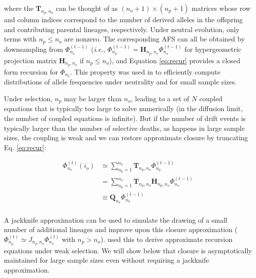 \documentclass[review]{elsarticle}
\newcommand{\afs}[2]{\Phi_{#1}^{(#2)}}
\begin{document}
where the $\mathbf{T}_{n_p,n_o}$ can be thought of as  $(n_o+1) \times (n_p+1)$ matrices whose row and column indices
correspond to the number of derived alleles in the offspring and contributing parental lineages,
respectively.
Under neutral evolution,  only terms with $n_p\leq n_o$ are nonzero. The corresponding AFS can 
all be obtained by downsampling from $\afs{n_o}{t-1}$ (\textit{i.e.}, $\afs{n_p}{t-1} = \mathbf{H}_{n_p,n_o} \afs{n_o}{t-1}$
for hypergeometric projection matrix $\mathbf{H}_{n_p,n_o}$ if $n_p\leq n_o$), and Equation
\eqref{eq:recur} provides a closed form recursion for $\Phi_{n_o}.$ This property was used in
\cite{JouganousEtAl2017} to efficiently compute distributions of allele frequencies under 
neutrality and for small sample sizes.

Under selection, $n_{p}$ may be larger than $n_o$, leading to a set of $N$ coupled
equations that is typically too large to solve numerically (in the diffusion limit, the number of coupled equations is infinite). 
But if the number of drift events is typically larger than the number of selective deaths, as happens in large sample sizes, 
the coupling is weak and we can restore approximate closure by truncating Eq. \eqref{eq:recur}:

\begin{equation}
\begin{split}
  \afs{n_o}{t}(i_o)
  &\simeq \sum_{n_p=1}^{n_{o}} \mathbf{T}_{n_p,n_o}                      \afs{n_p}{t-1}\\
  &=      \sum_{n_p=1}^{n_{o}} \mathbf{T}_{n_p,n_o} \mathbf{H}_{n_p,n_o} \afs{n_o}{t-1}\\
  &\equiv \mathbf{Q}_{n_o}                                               \afs{n_o}{t-1}\\
\end{split}
\label{eq:truncated}
\end{equation}

A jackknife approximation \cite{Gravel2016jackknife} can be used to simulate the drawing of a small number of additional
lineages and improve upon this closure approximation ($\afs{n_p}{t} \simeq J_{n_p,n_o} \afs{n_o}{t}$
with $n_p>n_o$). \cite{JouganousEtAl2017} used this to derive approximate recursion equations under
weak selection. We will show below that closure is asymptotically maintained for large sample sizes
even without requiring a jackknife approximation.
\end{document}
